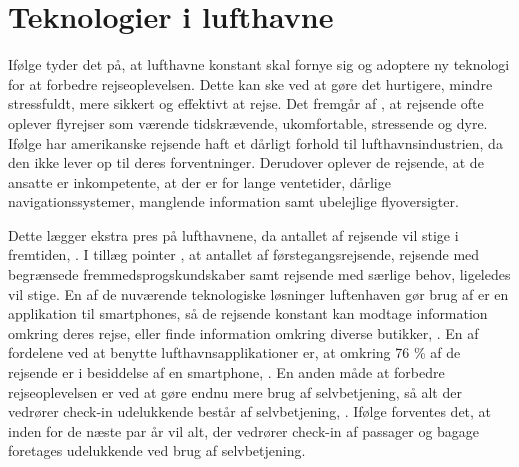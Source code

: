 \section{Teknologier i lufthavne}
\label{Lufthavne}
%
Ifølge \textcite[s. 203]{PDF:FutureAirportTerminals} tyder det på, at lufthavne konstant skal fornye sig og adoptere ny teknologi for at forbedre rejseoplevelsen. Dette kan ske ved at gøre det hurtigere, mindre stressfuldt, mere sikkert og effektivt at rejse. Det fremgår af \textcite[s. 203]{PDF:FutureAirportTerminals}, at rejsende ofte oplever flyrejser som værende tidskrævende, ukomfortable, stressende og dyre. Ifølge \textcite[s. 351]{PDF:TheImpactOfTraveler} har amerikanske rejsende haft et dårligt forhold til lufthavnsindustrien, da den ikke lever op til deres forventninger. Derudover oplever de rejsende, at de ansatte er inkompetente, at der er for lange ventetider, dårlige navigationssystemer, manglende information samt ubelejlige flyoversigter.  

Dette lægger ekstra pres på lufthavnene, da antallet af rejsende vil stige i fremtiden, \parencite[s. 203]{PDF:FutureAirportTerminals}. I tillæg pointer \textcite[s. 609]{PDF:SpencerProject}, at antallet af førstegangsrejsende, rejsende med begrænsede fremmedsprogskundskaber samt rejsende med særlige behov, ligeledes vil stige. En af de nuværende teknologiske løsninger luftenhaven gør brug af er en applikation til smartphones, så de rejsende konstant kan modtage information omkring deres rejse, eller finde information omkring diverse butikker, \parencite[s. 203]{PDF:FutureAirportTerminals}. En af fordelene ved at benytte lufthavnsapplikationer er, at omkring 76 \% af de rejsende er i besiddelse af en smartphone, \parencite[s. 203]{PDF:FutureAirportTerminals}. En anden måde at forbedre rejseoplevelsen er ved at gøre endnu mere brug af selvbetjening, så alt der vedrører check-in udelukkende består af selvbetjening, \parencite[s. 205]{PDF:FutureAirportTerminals}. Ifølge \textcite[s. 351]{PDF:TheImpactOfTraveler} forventes det, at inden for de næste par år vil alt, der vedrører check-in af passager og bagage foretages udelukkende ved brug af selvbetjening. 

